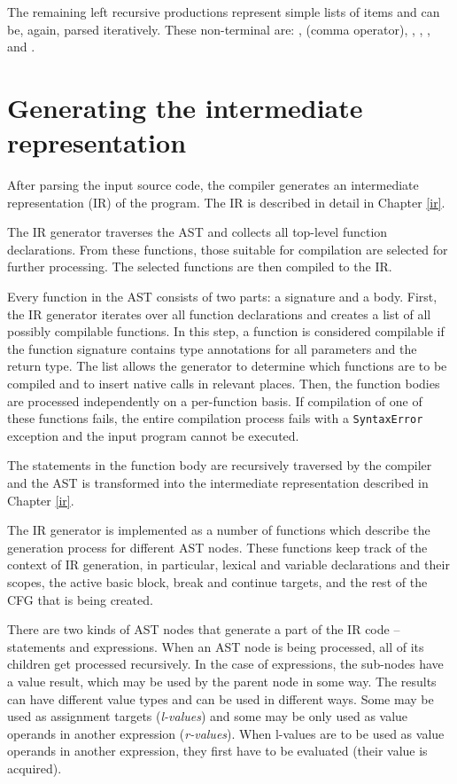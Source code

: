 The remaining left recursive productions represent simple lists of items and can be, again, parsed iteratively. These non-terminal are: \nonterminal[FormalParameters]{}{}, \nonterminal[Expression]{}{} (comma operator), \nonterminal[LexicalDeclaration]{}{}, \nonterminal[VariableDeclaration]{}{}, \nonterminal[Arguments]{}{}, and \nonterminal[StatementList]{}{}.


\section{Generating the intermediate representation}

After parsing the input source code, the compiler generates an intermediate representation (IR) of the program. The IR is described in detail in Chapter \ref{ir}.

The IR generator traverses the AST and collects all top-level function declarations. From these functions, those suitable for compilation are selected for further processing. The selected functions are then compiled to the IR.

Every function in the AST consists of two parts: a signature and a body. First, the IR generator iterates over all function declarations and creates a list of all possibly compilable functions. In this step, a function is considered compilable if the function signature contains type annotations for all parameters and the return type. The list allows the generator to determine which functions are to be compiled and to insert native calls in relevant places. Then, the function bodies are processed independently on a per-function basis. If compilation of one of these functions fails, the entire compilation process fails with a \texttt{SyntaxError} exception and the input program cannot be executed.

The statements in the function body are recursively traversed by the compiler and the AST is transformed into the intermediate representation described in Chapter \ref{ir}.

The IR generator is implemented as a number of functions which describe the generation process for different AST nodes. These functions keep track of the context of IR generation, in particular, lexical and variable declarations and their scopes, the active basic block, break and continue targets, and the rest of the CFG that is being created.

There are two kinds of AST nodes that generate a part of the IR code -- statements and expressions. When an AST node is being processed, all of its children get processed recursively. In the case of expressions, the sub-nodes have a value result, which may be used by the parent node in some way. The results can have different value types and can be used in different ways. Some may be used as assignment targets (\textit{l-values}) and some may be only used as value operands in another expression (\textit{r-values}). When l-values are to be used as value operands in another expression, they first have to be evaluated (their value is acquired).

